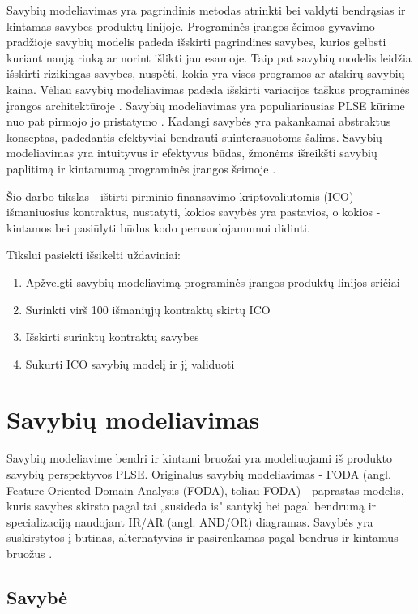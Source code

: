 \documentclass{VUMIFPSkursinis}
\begin{document}
Savybių modeliavimas yra pagrindinis metodas atrinkti bei valdyti bendrąsias ir kintamas savybes produktų linijoje. Programinės įrangos šeimos gyvavimo pradžioje savybių modelis padeda išskirti pagrindines savybes, kurios gelbsti kuriant naują rinką ar  norint išlikti jau esamoje. Taip pat savybių modelis leidžia išskirti rizikingas savybes, nuspėti, kokia yra visos programos ar atskirų savybių kaina. Vėliau savybių modeliavimas padeda išskirti variacijos taškus programinės įrangos architektūroje \cite{Czarnecki2004}. Savybių modeliavimas yra populiariausias PLSE kūrime nuo pat pirmojo jo pristatymo \cite{Kang1990}. Kadangi savybės yra pakankamai abstraktus konseptas, padedantis efektyviai bendrauti suinterasuotoms šalims. Savybių modeliavimas yra intuityvus ir efektyvus būdas, žmonėms išreikšti savybių paplitimą ir kintamumą programinės įrangos šeimoje \cite{Kang2013}. 

Šio darbo tikslas - ištirti pirminio finansavimo kriptovaliutomis (ICO) išmaniuosius kontraktus, nustatyti, kokios savybės yra pastavios, o kokios - kintamos bei pasiūlyti būdus kodo pernaudojamumui didinti. 

Tikslui pasiekti išsikelti uždaviniai:
\begin{enumerate}
\item Apžvelgti savybių modeliavimą programinės įrangos produktų linijos sričiai 
\item Surinkti virš 100 išmaniųjų kontraktų skirtų ICO
\item Išskirti surinktų kontraktų savybes
\item Sukurti ICO savybių modelį ir jį validuoti
\end{enumerate}

\section{Savybių modeliavimas}

Savybių modeliavime bendri ir kintami bruožai yra modeliuojami iš produkto savybių perspektyvos PLSE. Originalus savybių modeliavimas - FODA (angl. Feature-Oriented Domain Analysis (FODA), toliau FODA) \cite{Kang1990} - paprastas modelis, kuris savybes skirsto pagal tai „susideda is" santykį bei pagal bendrumą ir specializaciją naudojant IR/AR (angl. AND/OR)  diagramas. Savybės yra suskirstytos į būtinas, alternatyvias ir pasirenkamas pagal bendrus ir kintamus bruožus \cite{Kang2013}.

\subsection{Savybė} \label{savybe}
\end{document}
